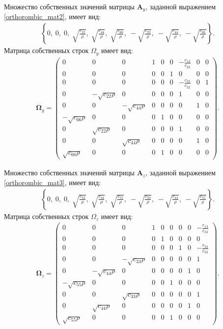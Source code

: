 	Множество собственных значений матрицы $\mathbf{A}_y$, заданной выражением \eqref{orthorombic_mat2}, имеет вид:
\begin{align}
	\left\{0,\;0,\;0,\;\sqrt{\frac{c_{22}}{\rho}},\;\sqrt{\frac{c_{44}}{\rho}},\;\sqrt{\frac{c_{66}}{\rho}},\;-\sqrt{\frac{c_{22}}{\rho}},\;-\sqrt{\frac{c_{44}}{\rho}},\;-\sqrt{\frac{c_{66}}{\rho}}\right\}.
\end{align}
	Матрица собственных строк $\Omega_y$ имеет вид:
\begin{align}
\mathbf{\Omega}_y =
\left( \begin{array}{cccccccccccc}
0 & 0 & 0 & 1 & 0 & 0 & -\frac{c_{12}}{c_{22}} & 0 & 0 \\ 
0 & 0 & 0 & 0 & 0 & 1 & 0 & 0 & 0 \\ 
0 & 0 & 0 & 0 & 0 & 0 & -\frac{c_{23}}{c_{22}} & 0 & 1 \\ 
0 & -\sqrt{c_{22}\rho} & 0 & 0 & 0 & 0 & 1 & 0 & 0 \\ 
0 & 0 & -\sqrt{c_{44}\rho} & 0 & 0 & 0 & 0 & 1 & 0 \\
-\sqrt{c_{66}\rho} & 0 & 0 & 0 & 1 & 0 & 0 & 0 & 0 \\ 
0 & \sqrt{c_{22}\rho} & 0 & 0 & 0 & 0 & 1 & 0 & 0 \\ 
0 & 0 & \sqrt{c_{44}\rho} & 0 & 0 & 0 & 0 & 1 & 0 \\
\sqrt{c_{66}\rho} & 0 & 0 & 0 & 1 & 0 & 0 & 0 & 0
\end{array} \right).
\end{align}

	Множество собственных значений матрицы $\mathbf{A}_z$, заданной выражением \eqref{orthorombic_mat3}, имеет вид:
\begin{align}
	\left\{0,\;0,\;0,\;\sqrt{\frac{c_{33}}{\rho}},\;\sqrt{\frac{c_{44}}{\rho}},\;\sqrt{\frac{c_{55}}{\rho}},\;-\sqrt{\frac{c_{33}}{\rho}},\;-\sqrt{\frac{c_{44}}{\rho}},\;-\sqrt{\frac{c_{55}}{\rho}}\right\}.
\end{align}
	Матрица собственных строк $\Omega_z$ имеет вид:
\begin{align}
\mathbf{\Omega}_z =
\left( \begin{array}{cccccccccccc}
0 & 0 & 0 & 1 & 0 & 0 & 0 & 0 & -\frac{c_{13}}{c_{33}} \\ 
0 & 0 & 0 & 0 & 1 & 0 & 0 & 0 & 0 \\ 
0 & 0 & 0 & 0 & 0 & 0 & 1 & 0 & -\frac{c_{23}}{c_{33}} \\ 
0 & 0 & -\sqrt{c_{33}\rho} & 0 & 0 & 0 & 0 & 0 & 1 \\ 
0 & -\sqrt{c_{44}\rho} & 0 & 0 & 0 & 0 & 0 & 1 & 0 \\
-\sqrt{c_{55}\rho} & 0 & 0 & 0 & 0 & 1 & 0 & 0 & 0 \\
0 & 0 & \sqrt{c_{33}\rho} & 0 & 0 & 0 & 0 & 0 & 1 \\ 
0 & \sqrt{c_{44}\rho} & 0 & 0 & 0 & 0 & 0 & 1 & 0 \\
\sqrt{c_{55}\rho} & 0 & 0 & 0 & 0 & 1 & 0 & 0 & 0
\end{array} \right).
\end{align}

